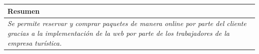 \begin{table}[H]
\begin{tabular}{|llllllll|}
    \multicolumn{8}{|l|}{\cellcolor[HTML]{F2F2F2}Resumen}                                                                                                                                                                            \\ \hline
    \multicolumn{8}{|p{15cm}|}{{\color[HTML]{808080} \textit{Se permite reservar y comprar paquetes de manera online por parte del cliente gracias a la implementación de la web por parte de los trabajadores de la empresa turística.}}} \\ \hline
    \end{tabular}
    \end{table}

